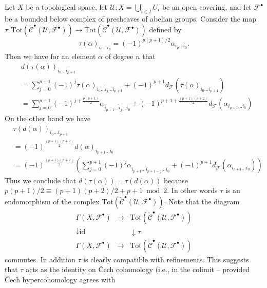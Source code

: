 \noindent
Let $X$ be a topological space, let $\mathcal{U} : X = \bigcup_{i \in I} U_i$
be an open covering, and let $\mathcal{F}^\bullet$ be a bounded below
complex of presheaves of abelian groups. Consider the map
$\tau :
\text{Tot}(\check{\mathcal{C}}^\bullet({\mathcal U}, {\mathcal F}^\bullet))
\to
\text{Tot}(\check{\mathcal{C}}^\bullet({\mathcal U}, {\mathcal F}^\bullet))$
defined by
$$
\tau(\alpha)_{i_0 \ldots i_p} = (-1)^{p(p + 1)/2} \alpha_{i_p \ldots i_0}.
$$
Then we have for an element $\alpha$ of degree $n$ that
\begin{align*}
& d(\tau(\alpha))_{i_0 \ldots i_{p + 1}} \\
& =
\sum\nolimits_{j = 0}^{p + 1}
(-1)^j
\tau(\alpha)_{i_0 \ldots \hat i_j \ldots i_{p + 1}}
+
(-1)^{p + 1}
d_{\mathcal F}(\tau(\alpha)_{i_0 \ldots i_{p + 1}})
\\
& =
\sum\nolimits_{j = 0}^{p + 1}
(-1)^{j + \frac{p(p + 1)}{2}}
\alpha_{i_{p + 1} \ldots \hat i_j \ldots i_0}
+
(-1)^{p + 1 + \frac{(p + 1)(p + 2)}{2}}
d_{\mathcal F}(\alpha_{i_{p + 1} \ldots i_0})
\end{align*}
On the other hand we have
\begin{align*}
& \tau(d(\alpha))_{i_0\ldots i_{p + 1}} \\
& =
(-1)^{\frac{(p + 1)(p + 2)}{2}} d(\alpha)_{i_{p + 1} \ldots i_0}
\\
& =
(-1)^{\frac{(p + 1)(p + 2)}{2}}
\left(
\sum\nolimits_{j = 0}^{p + 1}
(-1)^j
\alpha_{i_{p + 1}\ldots \hat i_{p + 1 - j} \ldots i_0}
+
(-1)^{p + 1}
d_{\mathcal F}(\alpha_{i_{p + 1}\ldots i_0})
\right)
\end{align*}
Thus we conclude that $d(\tau(\alpha)) = \tau(d(\alpha))$
because $p(p + 1)/2 \equiv (p + 1)(p + 2)/2 + p + 1 \bmod 2$. In other words
$\tau$ is an endomorphism of the complex
$\text{Tot}(\check{\mathcal{C}}^\bullet({\mathcal U}, {\mathcal F}^\bullet))$.
Note that the diagram
$$
\begin{matrix}
\Gamma(X, {\mathcal F}^\bullet) &
\longrightarrow &
\text{Tot}(\check{\mathcal{C}}^\bullet({\mathcal U}, {\mathcal F}^\bullet)) \\
\downarrow \text{id} & & \downarrow \tau \\
\Gamma(X, {\mathcal F}^\bullet) &
\longrightarrow &
\text{Tot}(\check{\mathcal{C}}^\bullet({\mathcal U}, {\mathcal F}^\bullet))
\end{matrix}
$$
commutes. In addition $\tau$ is clearly compatible with refinements.
This suggests that $\tau$ acts as the identity on {\v C}ech cohomology
(i.e., in the colimit -- provided {\v C}ech hypercohomology agrees with
